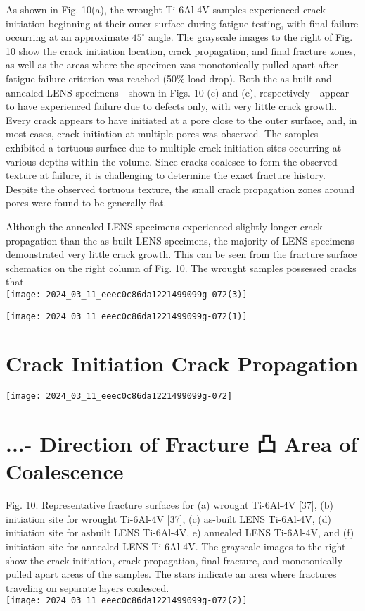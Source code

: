 \documentclass[10pt]{article}
\begin{document}
As shown in Fig. 10(a), the wrought Ti-6Al-4V samples experienced crack initiation beginning at their outer surface during fatigue testing, with final failure occurring at an approximate $45^{\circ}$ angle. The grayscale images to the right of Fig. 10 show the crack initiation location, crack propagation, and final fracture zones, as well as the areas where the specimen was monotonically pulled apart after fatigue failure criterion was reached (50\% load drop). Both the as-built and annealed LENS specimens - shown in Figs. 10 (c) and (e), respectively - appear to have experienced failure due to defects only, with very little crack growth. Every crack appears to have initiated at a pore close to the outer surface, and, in most cases, crack initiation at multiple pores was observed. The samples exhibited a tortuous surface due to multiple crack initiation sites occurring at various depths within the volume. Since cracks coalesce to form the observed texture at failure, it is challenging to determine the exact fracture history. Despite the observed tortuous texture, the small crack propagation zones around pores were found to be generally flat.

Although the annealed LENS specimens experienced slightly longer crack propagation than the as-built LENS specimens, the majority of LENS specimens demonstrated very little crack growth. This can be seen from the fracture surface schematics on the right column of Fig. 10. The wrought samples possessed cracks that\\
\texttt{[image: 2024\_03\_11\_eeec0c86da1221499099g-072(3)]}

\begin{center}
\texttt{[image: 2024\_03\_11\_eeec0c86da1221499099g-072(1)]}
\end{center}

\section*{Crack Initiation Crack Propagation}
\begin{center}
\texttt{[image: 2024\_03\_11\_eeec0c86da1221499099g-072]}
\end{center}

\section*{...- Direction of Fracture 凸 Area of Coalescence}
Fig. 10. Representative fracture surfaces for (a) wrought Ti-6Al-4V [37], (b) initiation site for wrought Ti-6Al-4V [37], (c) as-built LENS Ti-6Al-4V, (d) initiation site for asbuilt LENS Ti-6Al-4V, e) annealed LENS Ti-6Al-4V, and (f) initiation site for annealed LENS Ti-6Al-4V. The grayscale images to the right show the crack initiation, crack propagation, final fracture, and monotonically pulled apart areas of the samples. The stars indicate an area where fractures traveling on separate layers coalesced.\\
\texttt{[image: 2024\_03\_11\_eeec0c86da1221499099g-072(2)]}
\end{document}
